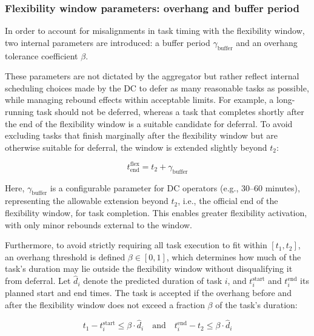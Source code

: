 \documentclass[preprint,12pt]{elsarticle}
\begin{document}
\subsubsection{Flexibility window parameters: overhang and buffer period}


In order to account for misalignments in task timing with the flexibility window, two internal parameters are introduced: a buffer period $\gamma_{\text{buffer}}$ and an overhang tolerance coefficient $\beta$.

These parameters are not dictated by the aggregator but rather reflect internal scheduling choices made by the DC to defer as many reasonable tasks as possible, while managing rebound effects within acceptable limits. %
For example, a long-running task should not be deferred, whereas a task that completes shortly after the end of the flexibility window is a suitable candidate for deferral.
To avoid excluding tasks that finish marginally after the flexibility window but are otherwise suitable for deferral, the window is extended slightly beyond $t_2$:

\begin{equation}
    t_{\text{end}}^{\text{flex}} = t_2 + \gamma_{\text{buffer}}
\end{equation}

Here, $\gamma_{\text{buffer}}$ is a configurable parameter for DC operators (e.g., 30–60 minutes), representing the allowable extension beyond $t_2 $, i.e.,  the official end of the flexibility window, for task completion. This enables greater flexibility activation, with only minor rebounds external to the window.

Furthermore, to avoid strictly requiring all task execution to fit within $[t_1, t_2]$, an overhang threshold is defined $\beta \in [0, 1]$, which determines how much of the task's duration may lie outside the flexibility window without disqualifying it from deferral. Let $\hat{d}_i$ denote the predicted duration of task $i$, and $t_i^{\text{start}}$ and $t_i^{\text{end}}$ its planned start and end times. The task is accepted if the overhang before and after the flexibility window does not exceed a fraction $\beta$ of the task's duration:

\begin{equation}
    t_1 - t_i^{\text{start}} \leq \beta \cdot \hat{d}_i \quad \text{and} \quad t_i^{\text{end}} - t_2 \leq \beta \cdot \hat{d}_i
\end{equation}
\end{document}

